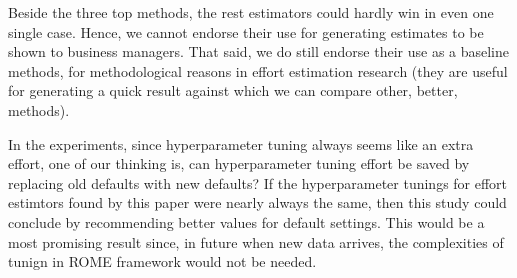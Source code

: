 \documentclass[sigconf,review]{acmart}
\begin{document}
Beside the three top methods, the rest estimators could hardly win in even one single case. Hence, we cannot endorse their use for generating estimates to be shown to business managers.
That said, we do still endorse their use as a  baseline methods, for methodological reasons in effort estimation research (they are useful for generating a quick result against which we can compare other, better, methods).

In the experiments, since hyperparameter tuning always seems like an extra effort, one of our thinking is, can hyperparameter tuning effort be saved by replacing old defaults with new defaults? If the hyperparameter tunings for effort estimtors found by this paper were nearly always the same, then this study
could conclude by recommending better values for default settings. This would
be a most promising result since, in future when new data arrives, the complexities of tunign in ROME framework would not be needed. 
\end{document}
